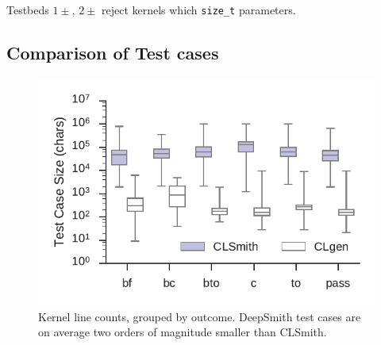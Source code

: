 Testbeds $1\pm$, $2\pm$ reject kernels which \texttt{size\_t} parameters.


\subsection{Comparison of Test cases}

\begin{figure}
	\centering %
	\includegraphics[width=\columnwidth]{build/img/kernel-sizes}%
	\caption{%
		Kernel line counts, grouped by outcome. DeepSmith test cases are on average two orders of magnitude smaller than CLSmith.%
	}%
	\label{fig:kernel-sizes} %
\end{figure}

